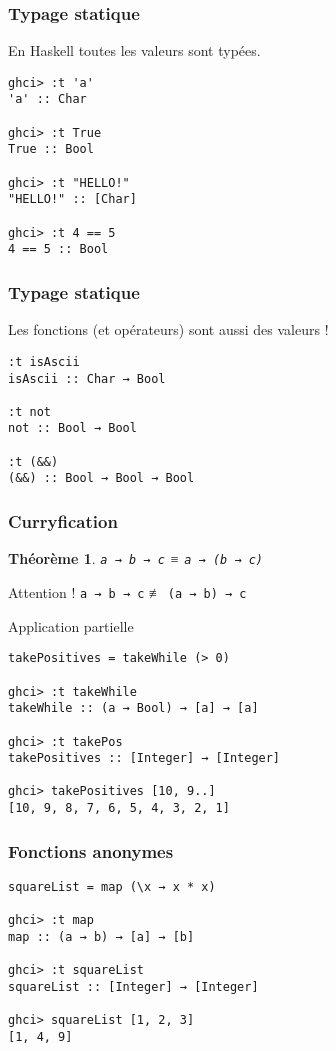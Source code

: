 \documentclass[10pt]{beamer}
\newtheorem{thrm}{Théorème}
\begin{document}
\begin{frame}[fragile]
\frametitle{Typage statique}
En Haskell toutes les valeurs sont typées.
\begin{verbatim}
ghci> :t 'a'
'a' :: Char

ghci> :t True
True :: Bool

ghci> :t "HELLO!"
"HELLO!" :: [Char]

ghci> :t 4 == 5
4 == 5 :: Bool
\end{verbatim}
\end{frame}



\begin{frame}[fragile]
\frametitle{Typage statique}
Les fonctions (et opérateurs) sont aussi des valeurs !
\begin{verbatim}
:t isAscii
isAscii :: Char → Bool

:t not
not :: Bool → Bool

:t (&&)
(&&) :: Bool → Bool → Bool
\end{verbatim}
\end{frame}



\begin{frame}[fragile]
\frametitle{Curryfication}
\begin{thrm}
\verb|a → b → c| ≡ \verb|a → (b → c)|
\end{thrm}

\pause

\begin{block}
{Attention !}
\verb|a → b → c| ≢ \verb|(a → b) → c|
\end{block}

\pause

\begin{block}
{Application partielle}
\begin{verbatim}
takePositives = takeWhile (> 0)

ghci> :t takeWhile
takeWhile :: (a → Bool) → [a] → [a]

ghci> :t takePos
takePositives :: [Integer] → [Integer]

ghci> takePositives [10, 9..]
[10, 9, 8, 7, 6, 5, 4, 3, 2, 1]
\end{verbatim}
\end{block}
\end{frame}



\begin{frame}[fragile]
\frametitle{Fonctions anonymes}
\begin{verbatim}
squareList = map (\x → x * x)

ghci> :t map
map :: (a → b) → [a] → [b]

ghci> :t squareList
squareList :: [Integer] → [Integer]

ghci> squareList [1, 2, 3]
[1, 4, 9]
\end{verbatim}
\end{frame}
\end{document}
